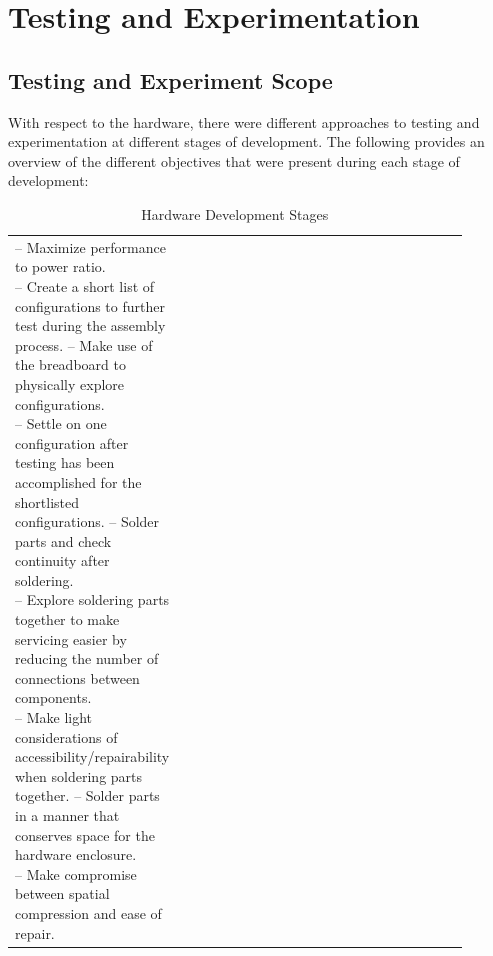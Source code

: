 \section{Testing and Experimentation}\label{sec:testing-and-experimentation}

\subsection{Testing and Experiment Scope}\label{subsec:testing-and-experiment-scope}

With respect to the hardware, there were different approaches
to testing and experimentation
at different stages of development.
The following provides an overview of the different objectives that were present during each stage of development:

\begin{table}[htbp]
      \begin{center}
            \begin{tabular}{|p{0.2\linewidth}|p{0.7\linewidth}|}
                  \hline
                  \tablex{Ideation}{
                        -- Maximize performance to power ratio.\newline
                        -- Create a short list of configurations to further test during the assembly process.
                  }
                  \tablex{Assembly}{
                        -- Make use of the breadboard to physically explore configurations.\newline
                        -- Settle on one configuration after testing has been accomplished for the shortlisted configurations.
                  }
                  \tablex{Prototyping}{
                        -- Solder parts and check continuity after soldering.\newline
                        -- Explore soldering parts together to make servicing easier by reducing the number of connections between components.\newline
                        -- Make light considerations of accessibility/repairability when soldering parts together.
                  }                                                                                                                
                  \tablex{Finalizing}{
                        -- Solder parts in a manner that conserves space for the hardware enclosure.\newline
                        -- Make compromise between spatial compression and ease of repair.
                  }                                                                                                             
            \end{tabular}
      \end{center}
      \caption{Hardware Development Stages}
  \end{table}

